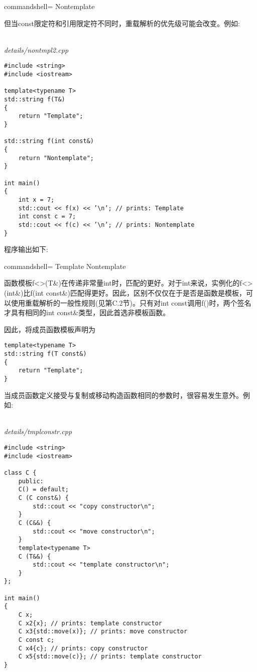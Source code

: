 \begin{tcblisting}{commandshell={}}
Nontemplate
\end{tcblisting}

但当const限定符和引用限定符不同时，重载解析的优先级可能会改变。例如:

\hspace*{\fill} \\ %
\noindent
\textit{details/nontmpl2.cpp}
\begin{lstlisting}[style=styleCXX]
#include <string>
#include <iostream>

template<typename T>
std::string f(T&)
{
	return "Template";
}

std::string f(int const&)
{
	return "Nontemplate";
}

int main()
{
	int x = 7;
	std::cout << f(x) << ’\n’; // prints: Template
	int const c = 7;
	std::cout << f(c) << ’\n’; // prints: Nontemplate
}
\end{lstlisting}

程序输出如下:

\begin{tcblisting}{commandshell={}}
Template
Nontemplate
\end{tcblisting}

函数模板f<>(T\&)在传递非常量int时，匹配的更好。对于int来说，实例化的f<>(int\&)比f(int const\&)匹配得更好。因此，区别不仅仅在于是否是函数是模板，可以使用重载解析的一般性规则(见第C.2节)。只有对int const调用f()时，两个签名才具有相同的int const\&类型，因此首选非模板函数。

因此，将成员函数模板声明为

\begin{lstlisting}[style=styleCXX]
template<typename T>
std::string f(T const&)
{
	return "Template";
}
\end{lstlisting}

当成员函数定义接受与复制或移动构造函数相同的参数时，很容易发生意外。例如:

\hspace*{\fill} \\ %
\noindent
\textit{details/tmplconstr.cpp}
\begin{lstlisting}[style=styleCXX]
#include <string>
#include <iostream>

class C {
	public:
	C() = default;
	C (C const&) {
		std::cout << "copy constructor\n";
	}
	C (C&&) {
		std::cout << "move constructor\n";
	}
	template<typename T>
	C (T&&) {
		std::cout << "template constructor\n";
	}
};

int main()
{
	C x;
	C x2{x}; // prints: template constructor
	C x3{std::move(x)}; // prints: move constructor
	C const c;
	C x4{c}; // prints: copy constructor
	C x5{std::move(c)}; // prints: template constructor
}
\end{lstlisting}

